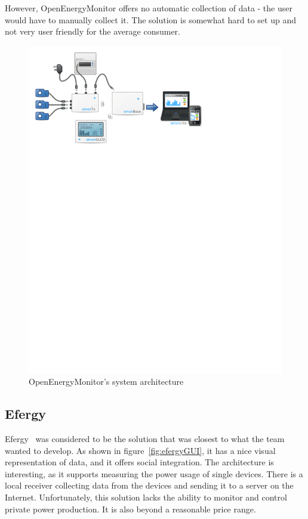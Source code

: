 However, OpenEnergyMonitor offers no automatic collection of data - the user would have to manually collect it. The solution is somewhat hard to set up and not very user friendly for the average consumer. 

\setcounter{figure}{1}
\begin{figure}[H]
\centering
\includegraphics[width=\textwidth, trim=0.5cm 19cm 6.5cm 0cm, clip]{ch/prestudy/fig/OEM_system.pdf}
\caption{OpenEnergyMonitor's system architecture}
\label{fig:oem}
\end{figure}

\subsection{Efergy}

Efergy~\cite{efergy} was considered to be the solution that was closest to what the team wanted to develop. As shown in figure~\ref{fig:efergyGUI}, it has a nice visual representation of data, and it offers social integration. The architecture is interesting, as it supports measuring the power usage of single devices. There is a local receiver collecting data from the devices and sending it to a server on the Internet. Unfortunately, this solution lacks the ability to monitor and control private power production. It is also beyond a reasonable price range.

